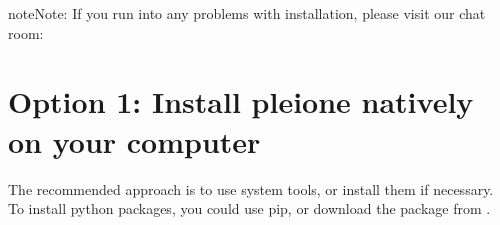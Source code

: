 \documentclass[letterpaper,10pt,english]{sphinxmanual}
\begin{document}
\begin{sphinxadmonition}{note}{Note:}
If you run into any problems with installation, please visit our chat room:
\end{sphinxadmonition}


\section{Option 1: Install pleione natively on your computer}
\label{\detokenize{Installation:option-1-install-pleione-natively-on-your-computer}}
The recommended approach is to use system tools, or install them if
necessary. To install python packages, you could use pip, or download
the package from .
\end{document}
